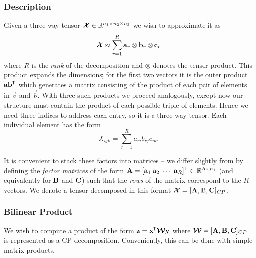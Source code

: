\subsubsection{Description}
Given a three-way tensor \(\bm{\mathcal{X}} \in \mathbb{R}^{n_1 \times n_2 \times n_3}\) we wish to 
approximate it as
\begin{equation}\label{eq:cp-statement}
	\bm{\mathcal{X}} \approx \sum_{r=1}^{R} \mathbf{a}_r \otimes \mathbf{b}_r \otimes \mathbf{c}_r
\end{equation}
 where \(R\) is the \emph{rank} of the decomposition and \( \otimes \) denotes the tensor
product. This product expands the dimensions; for the first two vectors it is the outer product
\(\mathbf{a}\mathbf{b}^{\mkern-1.5mu\mathsf{T}}\) which generates a matrix consisting of the product of each pair of
elements in \(\vec{a}\) and \(\vec{b}\). With three such products we proceed analogously, except
now our structure must contain the product of each possible triple of elements. Hence we need
three indices to address each entry, so it is a three-way tensor. Each individual
element has the form
\begin{equation}\label{eq:cp-element}
	X_{ijk} = \sum_{r=1}^R a_{ri}b_{rj}c_{rk}.
\end{equation}

It is convenient to stack these factors into matrices --
we differ slightly from \autocite{Kolda2009} by defining the \textit{factor matrices} of the 
form \(\mathbf{A} = [\mathbf{a}_1\;\mathbf{a}_2\;\cdots\;\mathbf{a}_R]^{\mathsf{T}} \in 
\mathbb{R}^{R\times n_1}\) (and equivalently for
\(\mathbf{B}\) and \(\mathbf{C}\)) such that the  \textit{rows} of the matrix correspond to the
\(R\) vectors. 
We denote a tensor decomposed in this format 
\(\bm{\mathcal{X}} = [\mathbf{A}, \mathbf{B}, \mathbf{C}]_{CP}\).

\subsubsection{Bilinear Product}
We wish to compute a product of the form \(\mathbf{z} = \mathbf{x}^{\mkern-1.5mu\mathsf{T}}\bm{\mathcal{W}}\mathbf{y}\)
where \(\bm{\mathcal{W}} = [\mathbf{A}, \mathbf{B}, \mathbf{C}]_{CP}\) is represented as a CP-decomposition.
Conveniently, this can be done with simple matrix products.

